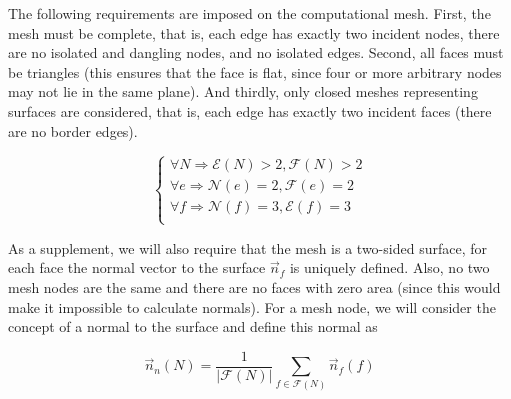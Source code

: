 \documentclass[
11pt,%
tightenlines,%
twoside,%
onecolumn,%
nofloats,%
nobibnotes,%
nofootinbib,%
superscriptaddress,%
noshowpacs,%
centertags]%
{revtex4-2}
\begin{document}
The following requirements are imposed on the computational mesh.
First, the mesh must be complete, that is, each edge has exactly two incident nodes, there are no isolated and dangling nodes, and no isolated edges.
Second, all faces must be triangles (this ensures that the face is flat, since four or more arbitrary nodes may not lie in the same plane).
And thirdly, only closed meshes representing surfaces are considered, that is, each edge has exactly two incident faces (there are no border edges).

\begin{equation}\label{eq_arch}
\begin{cases}
\forall N \Rightarrow \mathscr{E}(N) > 2, \mathscr{F}(N) > 2 \\
\forall e \Rightarrow \mathscr{N}(e) = 2 , \mathscr{F}(e) = 2 \\
\forall f \Rightarrow \mathscr{N}(f) = 3 , \mathscr{E}(f) = 3 \\
\end{cases}
\end{equation}

As a supplement, we will also require that the mesh is a two-sided surface, for each face the normal vector to the surface $\vec{n}_f$ is uniquely defined.
Also, no two mesh nodes are the same and there are no faces with zero area (since this would make it impossible to calculate normals).
For a mesh node, we will consider the concept of a normal to the surface and define this normal as

\begin{equation}
\vec{n}_n(N) = \frac{1}{|\mathscr{F}(N)|} \sum_{f \in \mathscr{F}(N)}{\vec{n}_f(f)}
\end{equation}
\end{document}
